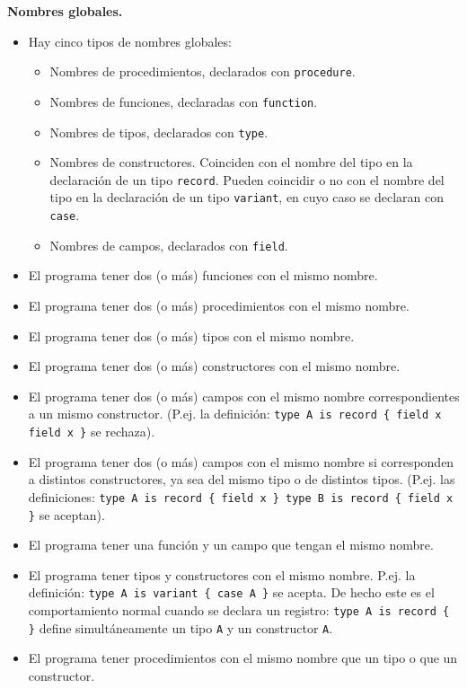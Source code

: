 \documentclass{article}
\begin{document}
{\bf Nombres globales.}
\begin{itemize}
\item Hay cinco tipos de nombres globales:
  \begin{itemize}
  \item Nombres de procedimientos, declarados con \texttt{procedure}.
  \item Nombres de funciones, declaradas con \texttt{function}.
  \item Nombres de tipos, declarados con \texttt{type}.
  \item Nombres de constructores.
        Coinciden con el nombre del tipo en la declaraci\'on de un tipo \texttt{record}.
        Pueden coincidir o no con el nombre del tipo en la declaraci\'on de un tipo \texttt{variant},
        en cuyo caso se declaran con \texttt{case}.
  \item Nombres de campos, declarados con \texttt{field}.
  \end{itemize}
\item El programa \NOPUEDE tener dos (o m\'as) funciones con el mismo nombre.
\item El programa \NOPUEDE tener dos (o m\'as) procedimientos con el mismo nombre.
\item El programa \NOPUEDE tener dos (o m\'as) tipos con el mismo nombre.
\item El programa \NOPUEDE tener dos (o m\'as) constructores con el mismo nombre.
\item El programa \NOPUEDE tener dos (o m\'as) campos con el mismo nombre correspondientes a un mismo constructor.
      (P.ej. la definici\'on: \texttt{type A is record \{ field x field x \}} se rechaza).
\item El programa \PUEDE tener dos (o m\'as) campos con el mismo nombre si corresponden a distintos constructores,
      ya sea del mismo tipo o de distintos tipos.
      (P.ej. las definiciones: \texttt{type A is record \{ field x \} type B is record \{ field x \}} se aceptan).
\item El programa \NOPUEDE tener una funci\'on y un campo que tengan el mismo nombre.
\item El programa \PUEDE tener tipos y constructores con el mismo nombre.
      P.ej. la definici\'on: \texttt{type A is variant \{ case A {} \}} se acepta.
      De hecho este es el comportamiento normal cuando se declara un registro:
      \texttt{type A is record \{ \}} define simult\'aneamente un tipo \texttt{A}
      y un constructor \texttt{A}.
\item El programa \PUEDE tener procedimientos con el mismo nombre que un tipo o que un constructor.
\end{itemize}
\end{document}
